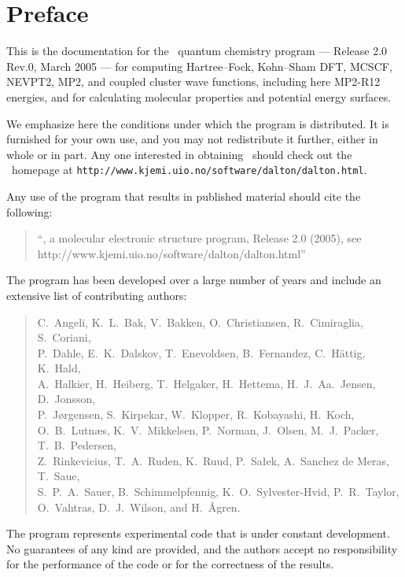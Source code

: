 \tableofcontents

\chapter*{Preface}

This is the documentation for the \dalton\ quantum chemistry program
--- Release 2.0 Rev.0, March 2005 --- for computing Hartree--Fock, Kohn--Sham DFT, 
MCSCF, NEVPT2,  MP2, and coupled cluster wave functions, including here MP2-R12 energies, and for calculating 
molecular properties and potential energy surfaces.

          We emphasize here the conditions under which the
program is distributed.  It is furnished for your own use,
and you may not redistribute it further, either in whole or in
part.  Any one interested in obtaining \dalton\ should check out the
\dalton\ homepage at
\verb|http://www.kjemi.uio.no/software/dalton/dalton.html|.

Any use of the program that results in published
material should cite the following:
\begin{quote}
``\dalton , a molecular electronic  structure program, Release
2.0 (2005), see http://www.kjemi.uio.no/software/dalton/dalton.html''
\end{quote}

The program has been developed over a large number of years and
include an extensive list of contributing authors:

\begin{quote}
C.~Angeli,
K.~L.~Bak,
V.~Bakken,
O.~Christiansen,
R.~Cimiraglia,
S.~Coriani,\\
P.~Dahle,
E.~K.~Dalskov,
T.~Enevoldsen,
B.~Fernandez,
C.~H{\"a}ttig,
K.~Hald,\\
A.~Halkier,
H.~Heiberg,
T.~Helgaker,
H.~Hettema,
H.~J.~Aa.~Jensen,
D.~Jonsson,\\
P.~J{\o}rgensen,
S.~Kirpekar,
W.~Klopper,
R.~Kobayashi,
H.~Koch,
O.~B.~Lutn\ae s,
K.~V.~Mikkelsen,
P.~Norman,
J.~Olsen,
M.~J.~Packer,
T.~B.~Pedersen,\\
Z.~Rinkevicius,
T.~A.~Ruden,
K.~Ruud,
P.~Sa\l ek,
A.~Sanchez de Meras,
T.~Saue,\\
S.~P.~A.~Sauer,
B.~Schimmelpfennig,
K.~O.~Sylvester-Hvid,
P.~R.~Taylor,\\
O.~Vahtras,
D.~J.~Wilson,
and H.~{\AA}gren.
\end{quote}

          The program represents experimental code that is
under constant development.  No guarantees of any kind are
provided, and the authors accept no responsibility for the
performance of the code or for the correctness of the results.
